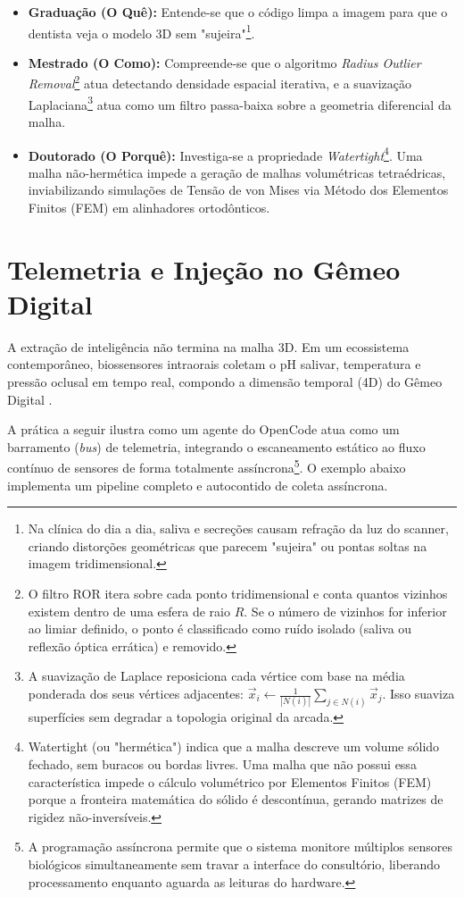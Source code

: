 \begin{itemize}
    \item \textbf{Graduação (O Quê):} Entende-se que o código limpa a imagem para que o dentista veja o modelo 3D sem "sujeira"\footnote{Na clínica do dia a dia, saliva e secreções causam refração da luz do scanner, criando distorções geométricas que parecem "sujeira" ou pontas soltas na imagem tridimensional.}.
    \item \textbf{Mestrado (O Como):} Compreende-se que o algoritmo \textit{Radius Outlier Removal}\footnote{O filtro ROR itera sobre cada ponto tridimensional e conta quantos vizinhos existem dentro de uma esfera de raio $R$. Se o número de vizinhos for inferior ao limiar definido, o ponto é classificado como ruído isolado (saliva ou reflexão óptica errática) e removido.} atua detectando densidade espacial iterativa, e a suavização Laplaciana\footnote{A suavização de Laplace reposiciona cada vértice com base na média ponderada dos seus vértices adjacentes: $\vec{x}_i \leftarrow \frac{1}{|N(i)|} \sum_{j \in N(i)} \vec{x}_j$. Isso suaviza superfícies sem degradar a topologia original da arcada.} atua como um filtro passa-baixa sobre a geometria diferencial da malha.
    \item \textbf{Doutorado (O Porquê):} Investiga-se a propriedade \textit{Watertight}\footnote{Watertight (ou "hermética") indica que a malha descreve um volume sólido fechado, sem buracos ou bordas livres. Uma malha que não possui essa característica impede o cálculo volumétrico por Elementos Finitos (FEM) porque a fronteira matemática do sólido é descontínua, gerando matrizes de rigidez não-inversíveis.}. Uma malha não-hermética impede a geração de malhas volumétricas tetraédricas, inviabilizando simulações de Tensão de von Mises via Método dos Elementos Finitos (FEM) em alinhadores ortodônticos.
\end{itemize}

\section{Telemetria e Injeção no Gêmeo Digital}

A extração de inteligência não termina na malha 3D. Em um ecossistema contemporâneo, biossensores intraorais coletam o pH salivar, temperatura e pressão oclusal em tempo real, compondo a dimensão temporal (4D) do Gêmeo Digital \cite{Khoshfekr2025}.

A prática a seguir ilustra como um agente do OpenCode atua como um barramento (\textit{bus}) de telemetria, integrando o escaneamento estático ao fluxo contínuo de sensores de forma totalmente assíncrona\footnote{A programação assíncrona permite que o sistema monitore múltiplos sensores biológicos simultaneamente sem travar a interface do consultório, liberando processamento enquanto aguarda as leituras do hardware.}. O exemplo abaixo implementa um pipeline completo e autocontido de coleta assíncrona.

